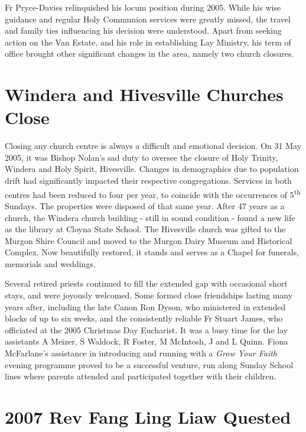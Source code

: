 Fr Pryce-Davies relinquished his locum position during 2005. While his wise guidance and regular Holy Communion services were greatly missed, the travel and family ties influencing his decision were understood. Apart from seeking action on the Van Estate, and his role in establishing Lay Ministry, his term of office brought other significant changes in the area, namely two church closures.



\section{Windera and Hivesville Churches Close}



Closing any church centre is always a difficult and emotional decision. On 31 May 2005, it was Bishop Nolan's sad duty to oversee the closure of Holy Trinity, Windera and Holy Spirit, Hivesville. Changes in demographics due to population drift had significantly impacted their respective congregations. Services in both centres had been reduced to four per year, to coincide with the occurrences of 5\textsuperscript{th} Sundays. The properties were disposed of that same year. After 47 years as a church, the Windera church building - still in sound condition - found a new life as the library at Cloyna State School. The Hivesville church was gifted to the Murgon Shire Council and moved to the Murgon Dairy Museum and Historical Complex. Now beautifully restored, it stands and serves as a Chapel for funerals, memorials and weddings.



Several retired priests continued to fill the extended gap with occasional short stays, and were joyously welcomed. Some formed close friendships lasting many years after, including the late Canon Ron Dyson, who ministered in extended blocks of up to six weeks, and the consistently reliable Fr Stuart James, who officiated at the 2005 Christmas Day Eucharist. It was a busy time for the lay assistants A Meizer, S Waldock, R Foster, M McIntosh, J and L Quinn. Fiona McFarlane's assistance in introducing and running with a \emph{Grow Your Faith} evening programme proved to be a successful venture, run along Sunday School lines where parents attended and participated together with their children.



\section{2007 Rev Fang Ling Liaw Quested}



